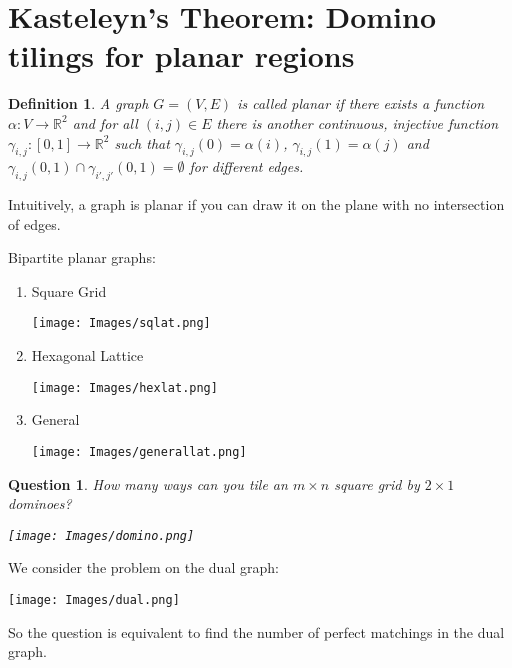 \documentclass[11pt]{article}
\newtheorem{definition}[theorem]{Definition}
\newtheorem{question}[theorem]{Question}
\begin{document}
\section{Kasteleyn's Theorem: Domino tilings for planar regions}

\begin{definition}
A graph $G=(V,E)$ is called \emph{planar} if there exists a function $\alpha:V\rightarrow \mathbb{R}^2$ and for all $(i,j)\in E$ there is another continuous, injective function $\gamma_{i,j}:[0,1]\rightarrow \mathbb{R}^2$ such that $\gamma_{i,j}(0)=\alpha(i)$, $\gamma_{i,j}(1)=\alpha(j)$ and $\gamma_{i,j}(0,1)\cap \gamma_{i',j'}(0,1)=\emptyset$ for different edges.
\end{definition}
Intuitively, a graph is planar if you can draw it on the plane with no intersection of edges.

Bipartite planar graphs:
\begin{multicols}{3}
\begin{enumerate}
    \item Square Grid
    \begin{center}
 	\texttt{[image: Images/sqlat.png]}
	\end{center}
    \item Hexagonal Lattice
    \begin{center}
 	\texttt{[image: Images/hexlat.png]}
	\end{center}
    \item General
    \begin{center}
 	\texttt{[image: Images/generallat.png]}
	\end{center}

\end{enumerate}
\end{multicols}

\begin{question}
How many ways can you tile an $m\times n$ square grid by $2\times 1$ dominoes?

    \begin{center}
 	\texttt{[image: Images/domino.png]}
	\end{center}
\end{question}
We consider the problem on the dual graph:

    \begin{center}
 	\texttt{[image: Images/dual.png]}
	\end{center}

So the question is equivalent to find the number of perfect matchings in the dual graph.
\end{document}
